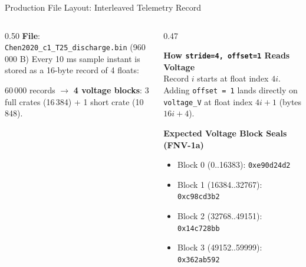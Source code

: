 \begin{frame}{Production File Layout: Interleaved Telemetry Record}
  \begin{columns}[t, onlytextwidth]
    \begin{column}{0.50\textwidth}
      \textbf{File}: \texttt{Chen2020\_c1\_T25\_discharge.bin} (960\,000 B)
      \vskip1.5mm
      Every 10 ms sample instant is stored as a 16-byte record of 4 floats:
      \vskip1mm
      \begin{center}
      \end{center}
      \vskip1.5mm
      {\footnotesize 60\,000 records $\rightarrow$ \textbf{4 voltage blocks}:
      3 full crates (16\,384) + 1 short crate (10\,848).}
    \end{column}
    \begin{column}{0.47\textwidth}
      \begin{highlight}
        \textbf{How \texttt{stride=4, offset=1} Reads Voltage} \\
        Record $i$ starts at float index $4i$. Adding \texttt{offset = 1} lands directly on \texttt{voltage\_V} at float index $4i + 1$ (bytes $16i + 4$).
      \end{highlight}
      \vskip2mm
      \begin{tech}
        \textbf{Expected Voltage Block Seals (FNV-1a)}
        \begin{itemize}
          \item Block 0 (0..16383): \texttt{0xe90d24d2}
          \item Block 1 (16384..32767): \texttt{0xc98cd3b2}
          \item Block 2 (32768..49151): \texttt{0x14c728bb}
          \item Block 3 (49152..59999): \texttt{0x362ab592}
        \end{itemize}
      \end{tech}
    \end{column}
  \end{columns}
\end{frame}

